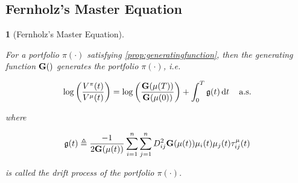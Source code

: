 \documentclass[british]{amsart} \usepackage{lmodern}
\numberwithin{equation}{section} \numberwithin{figure}{section}
\theoremstyle{plain} \newtheorem{thm}{\protect\theoremname}[section]
\theoremstyle{definition} \newtheorem{defn}[thm]{\protect\definitionname}
\theoremstyle{plain} \newtheorem{assumption}[thm]{\protect\assumptionname}
\theoremstyle{plain} \newtheorem{lem}[thm]{\protect\lemmaname}
\theoremstyle{plain} \newtheorem{prop}[thm]{\protect\propositionname}
\theoremstyle{remark} \newtheorem{rem}[thm]{\protect\remarkname}
\theoremstyle{plain} \newtheorem{cor}[thm]{\protect\corollaryname}
\renewcommand{\d}[1]{\mathop{\mathrm{d}{#1}}}
\begin{document}
\subsection{Fernholz's Master Equation}


\begin{lem} [Fernholz's Master Equation]
  \label{lem:masterequationlemma}

  For a portfolio $\pi(\cdot)$ satisfying \ref{prop:generatingfunction}, then the
  generating function $\mathbf{G}()$ generates the portfolio $\pi(\cdot)$, i.e.

  \begin{equation}
    \label{eq:masterequation}
    \log \left( \frac{V^{\pi}(t)}{V^{\mu}(t)} \right) = 
    \log \left( \frac{\G{\mu(T)}}{\G{\mu(0)}} \right) + 
      \int_{0}^{T} \g \d{t}
    \quad \almostsurely
  \end{equation}

  where 

  \begin{equation}
    \mathfrak{g}(t) \triangleq \frac{-1}{2 \mathbf{G}(\mu(t))}
        \sum_{i=1}^{n} \sum_{j=1}^{n} D_{ij}^{2} \mathbf{G}(\mu(t)) 
        \mu_{i}(t) \mu_{j}(t)
        \tau_{ij}^{\mu}(t)
  \end{equation}

  is called the \textit{drift process} of the portfolio $\pi(\cdot)$.

\end{lem}
\end{document}
